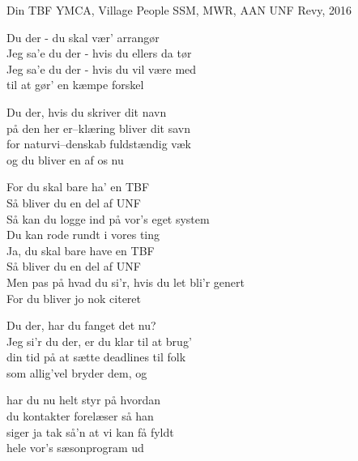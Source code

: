 \begin{song}{Din TBF}
  {} %
  {YMCA, Village People} %
  {SSM, MWR, AAN} %
  {UNF Revy, 2016} %
  {\NotCCLIed} %

  \begin{SBVerse}
    Du der - du skal vær’ arrangør\\
    Jeg sa’e du der - hvis du ellers da tør\\
    Jeg sa’e du der - hvis du vil være med\\
    til at gør’ en kæmpe forskel
  \end{SBVerse}

  \begin{SBVerse}
    Du der, hvis du skriver dit navn\\
    på den her er--klæring bliver dit savn\\
    for naturvi--denskab fuldstændig væk\\
    og du bliver en af os nu
  \end{SBVerse}

  \begin{SBChorus}
    For du skal bare ha' en TBF\\
    Så bliver du en del af UNF\\
    Så kan du logge ind på vor’s eget system\\
    Du kan rode rundt i vores ting\\\medskip
    Ja, du skal bare have en TBF\\
    Så bliver du en del af UNF\\
    Men pas på hvad du si’r, hvis du let bli’r genert\\
    For du bliver jo nok citeret
  \end{SBChorus}

  \begin{SBVerse}
    Du der, har du fanget det nu?\\
    Jeg si’r du der, er du klar til at brug’\\
    din tid på at sætte deadlines til folk\\
    som allig’vel bryder dem, og
  \end{SBVerse}

  \begin{SBVerse}
    har du nu helt styr på hvordan\\
    du kontakter forelæser så han\\
    siger ja tak så’n at vi kan få fyldt\\
    hele vor's sæsonprogram ud
  \end{SBVerse}


\end{song}
